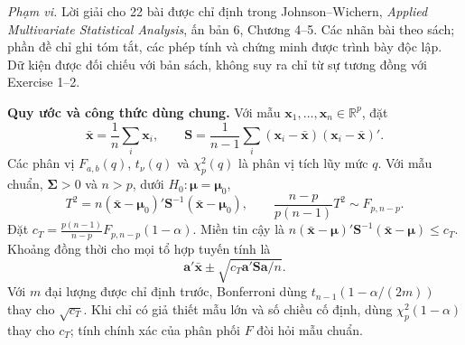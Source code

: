 \noindent\textit{Phạm vi.} Lời giải cho 22 bài được chỉ định trong Johnson--Wichern,
\textit{Applied Multivariate Statistical Analysis}, ấn bản 6, Chương 4--5.
Các nhãn bài theo sách; phần đề chỉ ghi tóm tắt, các phép tính và chứng minh
được trình bày độc lập. Dữ kiện được đối chiếu với bản sách, không suy ra
chỉ từ sự tương đồng với Exercise 1--2.

\medskip
\noindent\textbf{Quy ước và công thức dùng chung.}
Với mẫu $\mathbf{x}_1,\ldots,\mathbf{x}_n\in\mathbb R^p$, đặt
\[
\bar{\mathbf{x}}=\frac1n\sum_i\mathbf{x}_i,\qquad
\mathbf S=\frac1{n-1}\sum_i(\mathbf{x}_i-\bar{\mathbf{x}})
(\mathbf{x}_i-\bar{\mathbf{x}})'.
\]
Các phân vị $F_{a,b}(q)$, $t_\nu(q)$ và $\chi_p^2(q)$ là phân vị tích lũy mức $q$.
Với mẫu chuẩn, $\boldsymbol\Sigma>0$ và $n>p$, dưới $H_0:\boldsymbol\mu=\boldsymbol\mu_0$,
\[
T^2=n(\bar{\mathbf x}-\boldsymbol\mu_0)'\mathbf S^{-1}
(\bar{\mathbf x}-\boldsymbol\mu_0),\qquad
\frac{n-p}{p(n-1)}T^2\sim F_{p,n-p}.
\]
Đặt $c_T=\frac{p(n-1)}{n-p}F_{p,n-p}(1-\alpha)$. Miền tin cậy là
$n(\bar{\mathbf x}-\boldsymbol\mu)'\mathbf S^{-1}(\bar{\mathbf x}-\boldsymbol\mu)\le c_T$.
Khoảng đồng thời cho mọi tổ hợp tuyến tính là
\[
\mathbf a'\bar{\mathbf x}\pm\sqrt{c_T\mathbf a'\mathbf S\mathbf a/n}.
\]
Với $m$ đại lượng được chỉ định trước, Bonferroni dùng
$t_{n-1}(1-\alpha/(2m))$ thay cho $\sqrt{c_T}$.
Khi chỉ có giả thiết mẫu lớn và số chiều cố định, dùng $\chi_p^2(1-\alpha)$
thay cho $c_T$; tính chính xác của phân phối $F$ đòi hỏi mẫu chuẩn.
